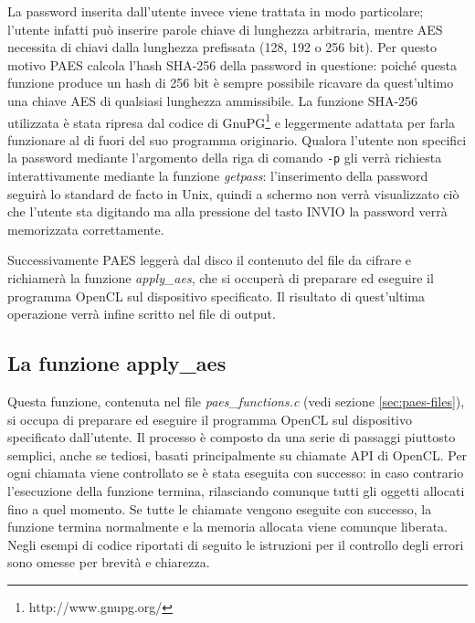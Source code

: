 \documentclass[12pt,a4paper,oneside]{book}
\begin{document}
La password inserita dall'utente invece viene trattata in modo particolare; l'utente infatti può inserire parole chiave di lunghezza arbitraria, mentre \ac{AES} necessita di chiavi dalla lunghezza prefissata (128, 192 o 256 bit). Per questo motivo PAES calcola l'hash SHA-256 della password in questione: poiché questa funzione produce un hash di 256 bit è sempre possibile ricavare da quest'ultimo una chiave \ac{AES} di qualsiasi lunghezza ammissibile. La funzione SHA-256 utilizzata è stata ripresa dal codice di \ac{GnuPG}\footnote{http://www.gnupg.org/} e leggermente adattata per farla funzionare al di fuori del suo programma originario. Qualora l'utente non specifici la password mediante l'argomento della riga di comando \verb|-p| gli verrà richiesta interattivamente mediante la funzione \textit{getpass}: l'inserimento della password seguirà lo standard de facto in Unix, quindi a schermo non verrà visualizzato ciò che l'utente sta digitando ma alla pressione del tasto INVIO la password verrà memorizzata correttamente.

Successivamente PAES leggerà dal disco il contenuto del file da cifrare e richiamerà la funzione \textit{apply\_aes}, che si occuperà di preparare ed eseguire il programma \ac{OpenCL} sul dispositivo specificato. Il risultato di quest'ultima operazione verrà infine scritto nel file di output.

\subsection{La funzione apply\_aes}
\label{sec:paes-apply-aes}

Questa funzione, contenuta nel file \textit{paes\_functions.c} (vedi sezione \ref{sec:paes-files}), si occupa di preparare ed eseguire il programma \ac{OpenCL} sul dispositivo specificato dall'utente. Il processo è composto da una serie di passaggi piuttosto semplici, anche se tediosi, basati principalmente su chiamate \ac{API} di \ac{OpenCL}. Per ogni chiamata viene controllato se è stata eseguita con successo: in caso contrario l'esecuzione della funzione termina, rilasciando comunque tutti gli oggetti allocati fino a quel momento. Se tutte le chiamate vengono eseguite con successo, la funzione termina normalmente e la memoria allocata viene comunque liberata. Negli esempi di codice riportati di seguito le istruzioni per il controllo degli errori sono omesse per brevità e chiarezza.
\end{document}
